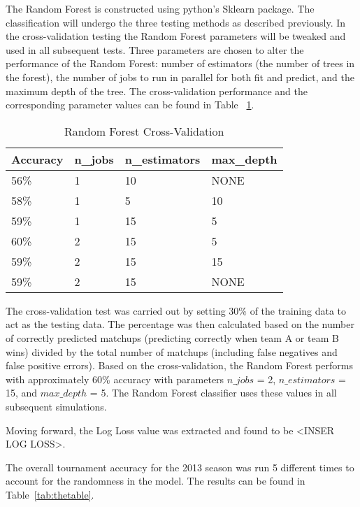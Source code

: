 \documentclass[conference]{IEEEtran}
\begin{document}
The Random Forest is constructed using python's Sklearn package. The classification will undergo the three testing methods as described previously. In the cross-validation testing the Random Forest parameters will be tweaked and used in all subsequent tests. Three parameters are chosen to alter the performance of the Random Forest: number of estimators (the number of trees in the forest), the number of jobs to run in parallel for both fit and predict, and the maximum depth of the tree. The cross-validation performance and the corresponding parameter values can be found in Table ~\ref{tab:RF_CV}.

\begin{table}[H]
	\centering
    \begin{tabular}{|l|l|l|l|}
    \hline
    \textbf{Accuracy} & \textbf{n\_jobs} & \textbf{n\_estimators} & \textbf{max\_depth} \\ \hline
    56\%     & 1       & 10            & NONE       \\ \hline
    58\%     & 1       & 5             & 10         \\ \hline
    59\%     & 1       & 15            & 5          \\ \hline
    60\%     & 2       & 15            & 5          \\ \hline
    59\%     & 2       & 15            & 15         \\ \hline
    59\%     & 2       & 15            & NONE       \\ \hline
    \end{tabular}
    \caption {Random Forest Cross-Validation}
    \label{tab:RF_CV}
\end{table}

The cross-validation test was carried out by setting 30\% of the training data to act as the testing data. The percentage was then calculated based on the number of correctly predicted matchups (predicting correctly when team A or team B wins) divided by the total number of matchups (including false negatives and false positive errors).  Based on the cross-validation, the Random Forest performs with approximately 60\% accuracy with parameters $n\_jobs$ = 2, $n\_estimators$ = 15, and $max\_depth$ = 5. The Random Forest classifier uses these values in all subsequent simulations.

Moving forward, the Log Loss value was extracted and found to be <INSER LOG LOSS>.

The overall tournament accuracy for the 2013 season was run 5 different times to account for the randomness in the model. The results can be found in Table~\ref{tab:thetable}.
\end{document}

